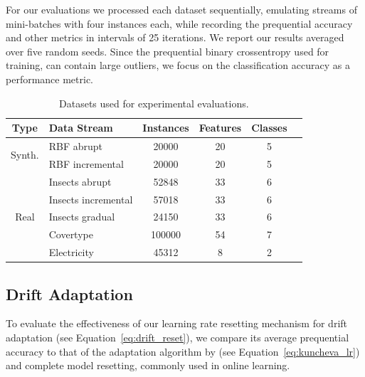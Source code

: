 \documentclass[letterpaper]{article} %
\begin{document}
For our evaluations we processed each dataset sequentially, emulating streams of mini-batches with four instances each, while recording the prequential accuracy and other metrics in intervals of 25 iterations.
We report our results averaged over five random seeds.
Since the prequential binary crossentropy used for training, can contain large outliers, we focus on the classification accuracy as a performance metric.



\begin{table}[ht]
	\small
	\begin{tabular}{@{}clcccc@{}}
		\toprule
		Type                    & Data Stream            & Instances & Features & Classes \\
		\midrule
		\multirow{2}{*}{Synth.} & RBF abrupt             & 20000     & 20       & 5       \\
		                        & RBF incremental        & 20000     & 20       & 5       \\
		\midrule
		\multirow{5}{*}{Real}   & Insects abrupt         & 52848     & 33       & 6       \\
		                        & Insects incremental    & 57018     & 33       & 6       \\
		                        & Insects gradual        & 24150     & 33       & 6       \\
		                        & Covertype\footnotemark & 100000    & 54       & 7       \\
		                        & Electricity            & 45312     & 8        & 2       \\
		\bottomrule
	\end{tabular}
	\caption{Datasets used for experimental evaluations.}
	\label{tab:datasets}
\end{table}



\subsection{Drift Adaptation}

To evaluate the effectiveness of our learning rate resetting mechanism for drift adaptation (see Equation~\eqref{eq:drift_reset}), we compare its average prequential accuracy to that of the adaptation algorithm by \citet{kunchevaAdaptiveLearningRate2008} (see Equation~\eqref{eq:kuncheva_lr}) and complete model resetting, commonly used in online learning.
\end{document}

